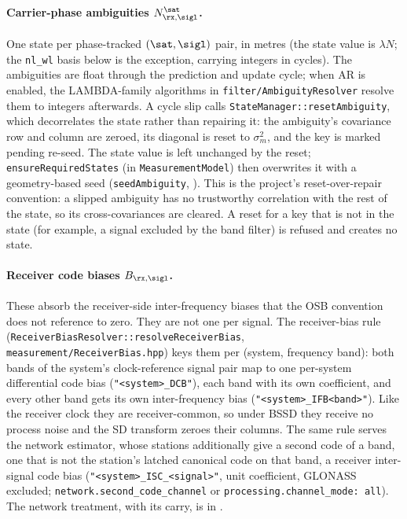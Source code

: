 \paragraph{Carrier-phase ambiguities $N^\sat_{\rx,\sigl}$.}
One state per phase-tracked $(\sat, \sigl)$ pair, in metres (the state
value is $\lambda N$; the \texttt{nl\_wl} basis below is the exception,
carrying integers in cycles).  The ambiguities are float through the
prediction and update cycle; when AR is enabled, the LAMBDA-family
algorithms in \texttt{filter/AmbiguityResolver}
\cite{teunissen1995lambda} resolve them to integers afterwards.  A cycle
slip calls \texttt{StateManager::resetAmbiguity}, which decorrelates the
state rather than repairing it: the ambiguity's covariance row and column
are zeroed, its diagonal is reset to $\sigma_m^2$, and the key is marked
pending re-seed.  The state value is left unchanged by the reset;
\texttt{ensureRequiredStates} (in \texttt{MeasurementModel}) then overwrites it with a
geometry-based seed (\texttt{seedAmbiguity}, ).
This is the project's reset-over-repair convention:
a slipped ambiguity has no trustworthy correlation with the rest of the
state, so its cross-covariances are cleared.  A reset for a key that is
not in the state (for example, a signal excluded by the band filter) is
refused and creates no state.

\paragraph{Receiver code biases $B_{\rx,\sigl}$.}
These absorb the receiver-side inter-frequency biases that the OSB
convention does not reference to zero.  They are not one per signal.
The receiver-bias rule (\texttt{ReceiverBiasResolver::resolveReceiverBias},
\texttt{measurement/ReceiverBias.hpp}) keys them per (system,
frequency band): both bands of the system's clock-reference signal pair
map to one per-system differential code bias (\texttt{"<system>\_DCB"}),
each band with its own coefficient, and every other band gets its own
inter-frequency bias (\texttt{"<system>\_IFB<band>"}).  Like the receiver
clock they are receiver-common, so under BSSD they receive no process
noise and the SD transform zeroes their columns.  The same rule serves the
network estimator, whose stations additionally give a second code of a
band, one that is not the station's latched canonical code on that band, a
receiver inter-signal code bias (\texttt{"<system>\_ISC\_<signal>"}, unit
coefficient, GLONASS excluded; \texttt{network.second\_code\_channel} or
\texttt{processing.channel\_mode: all}).  The network treatment, with its
carry, is in .


